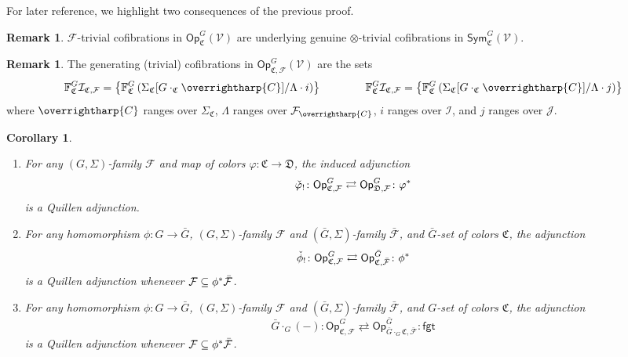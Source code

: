 \documentclass[a4paper,10pt
,draft
]{article}%
\numberwithin{equation}{section}
\numberwithin{figure}{section}
\newtheorem{corollary}[equation]{Corollary}%
\theoremstyle{definition} %
\newtheorem{remark}[equation]{Remark}%
\newcommand{\vect}[1]{\text{\overrightharp{\ensuremath{#1}}}}
\newcommand{\Op}{\mathsf{Op}}%
\newcommand{\F}{\ensuremath{\mathcal F}}
\newcommand{\V}{\ensuremath{\mathcal V}}
\newcommand{\1}{\ensuremath{\mathbbm 1}}%
\begin{document}
For later reference, 
we highlight two consequences of the previous proof.


\begin{remark}\label{GOTC_REM}
$\F$-trivial cofibrations in $\Op^G_{\mathfrak C}(\V)$ are underlying genuine $\otimes$-trivial cofibrations
in $\mathsf{Sym}^G_{\mathfrak C}(\V)$.
\end{remark}

\begin{remark}
The generating (trivial) cofibrations in
$\mathsf{Op}^G_{\mathfrak{C},\F}(\V)$
are the sets
\begin{equation}\label{FVGSIGF EQ}
	\mathbb{F}^G_{\mathfrak{C}}\mathcal{I}_{\mathfrak{C},\mathcal{F}}
=
	\left\{
	\mathbb{F}^G_{\mathfrak{C}}
	\left(\Sigma_{\mathfrak{C}}[G \cdot_{\mathfrak{C}} \vect{C}]/\Lambda \cdot i \right)
	\right\}
\qquad \qquad
	\mathbb{F}^G_{\mathfrak{C}}\mathcal{I}_{\mathfrak{C},\mathcal{F}}
=
	\left\{
	\mathbb{F}^G_{\mathfrak{C}}
	\left(\Sigma_{\mathfrak{C}}[G \cdot_{\mathfrak{C}} \vect{C}]/\Lambda \cdot j \right)
	\right\}
\end{equation}
where $\vect{C}$ ranges over $\Sigma_{\mathfrak{C}}$,
$\Lambda$ ranges over $\F_{\vect{C}}$,
$i$ ranges over $\mathcal{I}$,
and $j$ ranges over $\mathcal{J}$.
\end{remark}



\begin{corollary}\label{OPADJ_COR}
\begin{enumerate}[label=(\roman*)]
\item \label{OPCOCHADJ_LBL}
	For any $(G,\Sigma)$-family $\F$ and map of colors 
	$\varphi \colon \mathfrak C \to \mathfrak D$, the induced adjunction
		\[
		\check{\varphi}_! \colon \mathsf{Op}^G_{\mathfrak{C},\F}
			\rightleftarrows
		\mathsf{Op}^G_{\mathfrak{D},\F} \colon \varphi^{\**}
		\]
	is a Quillen adjunction.
\item \label{OPFIXSETCHGR_LBL}
	For any homomorphism $\phi \colon G \to \bar G$,
	$(G,\Sigma)$-family $\F$ and $(\bar G,\Sigma)$-family $\bar{\F}$,
	and $\bar G$-set of colors $\mathfrak C$,
	the adjunction
		\[
		\check{\phi}_! \colon \mathsf{Op}^G_{\mathfrak{C},\F}
			\rightleftarrows
		\mathsf{Op}^{\bar{G}}_{\mathfrak{C},\bar{\F}} \colon \phi^{\**}
		\]
	is a Quillen adjunction whenever $\F \subseteq \phi^{\**} \bar{\F}$.
\item \label{OPCOMBADJ_LBL}
	For any homomorphism $\phi \colon G \to \bar G$,
	$(G,\Sigma)$-family $\F$ and $(\bar G,\Sigma)$-family $\bar{\F}$,
	and $G$-set of colors $\mathfrak C$,
	the adjunction
            \[
                  \bar{G} \cdot_G (-) \colon \mathsf{Op}^G_{\mathfrak{C},\F}
                  \rightleftarrows
                  \mathsf{Op}^{\bar{G}}_{\bar{G} \cdot_G \mathfrak{C},\bar{\F}} \colon \mathsf{fgt}
            \]
	is a Quillen adjunction whenever $\F \subseteq \phi^{\**} \bar{\F}$.
      \end{enumerate}
\end{corollary}
\end{document}
